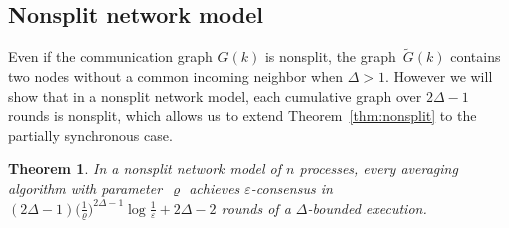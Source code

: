 \documentclass[a4paper]{article}
\theoremstyle{newthm}
\newtheorem{thm}{Theorem}
\begin{document}
	


\subsection{Nonsplit network model}

Even if the communication graph $G(k)$ is nonsplit, 
	 the graph~$\tilde{G}(k)$ contains two nodes without a common 
	incoming neighbor when $\Delta >1$.
However we will show that in a nonsplit network model, each cumulative graph over $2\Delta -1$ 
	rounds is nonsplit, which allows us to extend Theorem~\ref{thm:nonsplit} to the
	partially synchronous case. 
	


\begin{thm}\label{thm:nonsplit:delay}
In a nonsplit network model of $n$ processes, every averaging algorithm with 
	parameter~$\varrho$ achieves $\varepsilon$-consensus
	in $(2\Delta-1)\big(\frac{1}{\varrho}\big)^{2\Delta-1}\log \frac{1}{\varepsilon} + 2\Delta-2$
	rounds of a $\Delta$-bounded execution.
\end{thm}
\end{document}
